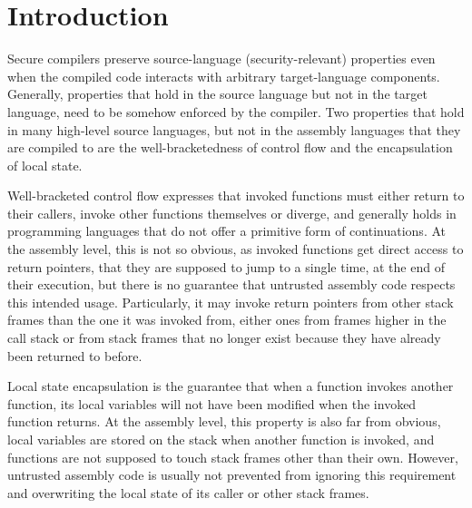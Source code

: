 \documentclass[sigplan, review]{acmart}
\begin{document}



\maketitle

\section{Introduction}
Secure compilers preserve source-language (security-relevant) properties even when the  compiled code interacts with arbitrary target-language components.
Generally, properties that hold in the source language but not in the target language, need to be somehow enforced by the compiler.
Two properties that hold in many high-level source languages, but not in the assembly languages that they are compiled to are the well-bracketedness of control flow and the encapsulation of local state.

Well-bracketed control flow expresses that invoked functions must either return to their callers, invoke other functions themselves or diverge, and generally holds in programming languages that do not offer a primitive form of continuations. 
At the assembly level, this is not so obvious, as invoked functions get direct access to return pointers, that they are supposed to jump to a single time, at the end of their execution, but there is no guarantee that untrusted assembly code respects this intended usage.
Particularly, it may invoke return pointers from other stack frames than the one it was invoked from, either ones from frames higher in the call stack or from stack frames that no longer exist because they have already been returned to before. 

Local state encapsulation is the guarantee that when a function invokes another function, its local variables will not have been modified when the invoked function returns.
At the assembly level, this property is also far from obvious, local variables are stored on the stack when another function is invoked, and functions are not supposed to touch stack frames other than their own.
However, untrusted assembly code is usually not prevented from ignoring this requirement and overwriting the local state of its caller or other stack frames.
\end{document}
